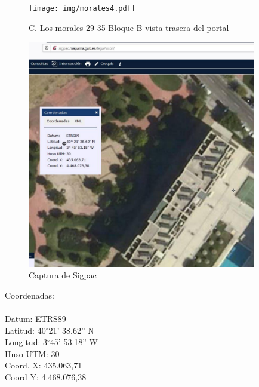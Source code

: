 \documentclass[letterpaper, 10pt]{article} %
\newcommand{\grad}{$^{\circ}$}
\begin{document}
\begin{figure}[h!]
\centering
\texttt{[image: img/morales4.pdf]}
\caption{C. Los morales 29-35 Bloque B vista trasera del portal}
\label{fig:morales2}
\end{figure}

\begin{figure}[h!]
\centering
\includegraphics[width=10cm]{img/sigpac.pdf}
\caption{Captura de Sigpac}
\label{fig:sigpac}
\end{figure}

Coordenadas:\\
\\
Datum: ETRS89 \\
Latitud: 40\grad 21' 38.62'' N \\
Longitud: 3\grad 45' 53.18'' W \\
Huso UTM: 30 \\
Coord. X: 435.063,71 \\
Coord Y: 4.468.076,38 \\



\newpage
\end{document}

